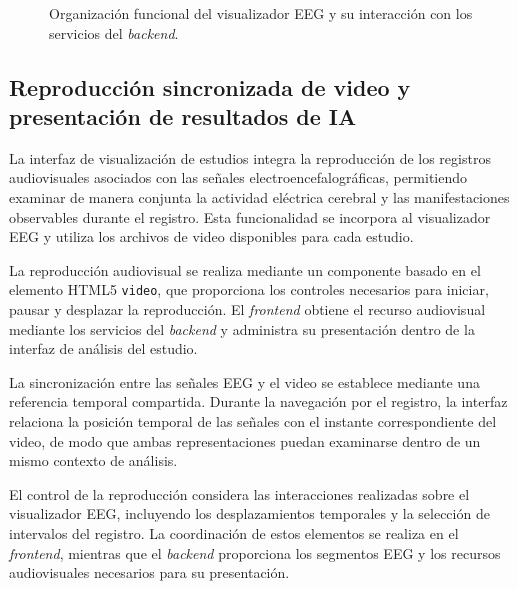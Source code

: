 \begin{figure}[htbp]

\caption{Organización funcional del visualizador EEG
y su interacción con los servicios del \textit{backend}.}
\label{fig:frontend-visualizador-eeg}
\end{figure}

\FloatBarrier

\subsection{Reproducción sincronizada de video y presentación de resultados de IA}

La interfaz de visualización de estudios
integra la reproducción de los registros
audiovisuales asociados con las señales
electroencefalográficas, permitiendo
examinar de manera conjunta la actividad
eléctrica cerebral y las manifestaciones
observables durante el registro. Esta
funcionalidad se incorpora al visualizador
EEG y utiliza los archivos de video
disponibles para cada estudio.

La reproducción audiovisual se realiza
mediante un componente basado en el
elemento HTML5 \texttt{video}, que
proporciona los controles necesarios
para iniciar, pausar y desplazar la
reproducción. El \textit{frontend} obtiene el
recurso audiovisual mediante los
servicios del \textit{backend} y administra
su presentación dentro de la interfaz
de análisis del estudio.

La sincronización entre las señales
EEG y el video se establece mediante
una referencia temporal compartida.
Durante la navegación por el registro,
la interfaz relaciona la posición
temporal de las señales con el instante
correspondiente del video, de modo
que ambas representaciones puedan
examinarse dentro de un mismo contexto
de análisis.

El control de la reproducción considera
las interacciones realizadas sobre
el visualizador EEG, incluyendo los
desplazamientos temporales y la
selección de intervalos del registro.
La coordinación de estos elementos
se realiza en el \textit{frontend}, mientras
que el \textit{backend} proporciona los
segmentos EEG y los recursos
audiovisuales necesarios para
su presentación.

